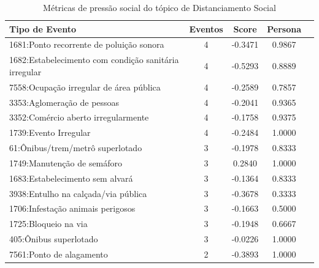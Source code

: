 \begin{table}[htbp]
	\centering
	\caption{Métricas de pressão social do tópico de Distanciamento Social}
	\label{tab:eventos_populares_social_distancing}
	\begin{tabular}{|l|c|c|c|c|}
		\hline
		\textbf{Tipo de Evento}                               & \textbf{Eventos} & \textbf{Score} & \textbf{Persona} \\
		\hline
		1681:Ponto recorrente de poluição sonora              & 4                & -0.3471        & 0.9867           \\
		\hline
		1682:Estabelecimento com condição sanitária irregular & 4                & -0.5293        & 0.8889           \\
		\hline
		7558:Ocupação irregular de área pública               & 4                & -0.2589        & 0.7857           \\
		\hline
		3353:Aglomeração de pessoas                           & 4                & -0.2041        & 0.9365           \\
		\hline
		3352:Comércio aberto irregularmente                   & 4                & -0.1758        & 0.9375           \\
		\hline
		1739:Evento Irregular                                 & 4                & -0.2484        & 1.0000           \\
		\hline
		61:Ônibus/trem/metrô superlotado                      & 3                & -0.1978        & 0.8333           \\
		\hline
		1749:Manutenção de semáforo                           & 3                & 0.2840         & 1.0000           \\
		\hline
		1683:Estabelecimento sem alvará                       & 3                & -0.1364        & 0.8333           \\
		\hline
		3938:Entulho na calçada/via pública                   & 3                & -0.3678        & 0.3333           \\
		\hline
		1706:Infestação animais perigosos                     & 3                & -0.1663        & 0.5000           \\
		\hline
		1725:Bloqueio na via                                  & 3                & -0.1948        & 0.6667           \\
		\hline
		405:Ônibus superlotado                                & 3                & -0.0226        & 1.0000           \\
		\hline
		7561:Ponto de alagamento                              & 2                & -0.3893        & 1.0000           \\

\end{tabular}
\end{table}

